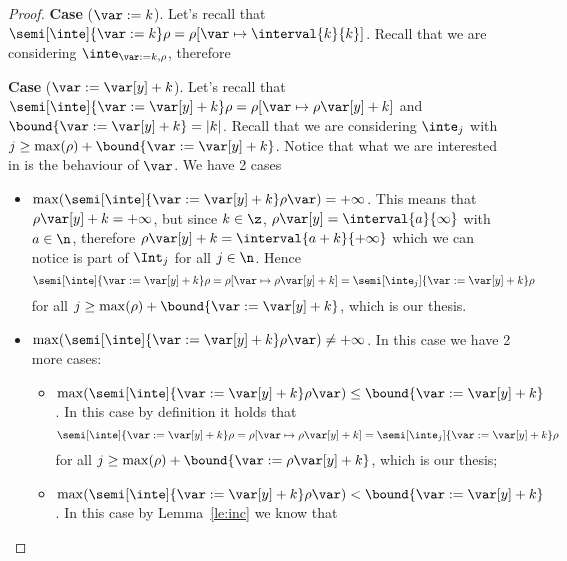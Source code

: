 \begin{proof}
  \medskip
  
  \noindent
  \textbf{Case} (\(\var := k\)).
  Let's recall that
  \({\semi[\inte]{\var := k}\rho = \rho[\var \mapsto \interval{k}{k}
    ]}\). Recall that we are considering \(\inte_{\var := k,\rho}\),
  therefore

  \medskip
  
  \noindent
  \textbf{Case} (\(\var := \var[y] + k\)).
  Let's recall that
  \({\semi[\inte]{\var := \var[y] + k}\rho = \rho[\var \mapsto
    \rho\var[y] + k]}\) and \(\bound{\var := \var[y] + k} =
  |k|\). Recall that we are considering \(\inte_j\) with
  \(j \geq \max(\rho) + \bound{\var := \var[y] + k}\). Notice that
  what we are interested in is the behaviour of \(\var\). We have 2
  cases
  \begin{itemize}
  \item
    \({\max(\semi[\inte]{\var := \var[y] + k}\rho\var)} =
    +\infty\). This means that \(\rho\var[y] + k = +\infty\), but
    since \(k \in \z\), \(\rho\var[y] = \interval{a}{\infty}\) with
    \(a \in \n\), therefore
    \({\rho\var[y] + k} = {\interval{a+k}{+\infty}}\) which we can
    notice is part of \(\Int_j\) for all \(j \in \n\). Hence
    \begin{equation*}
      \semi[\inte]{\var := \var[y] + k}\rho =
      \rho[\var \mapsto \rho\var[y] + k] =
      \semi[\inte_j]{\var := \var[y] + k}\rho
    \end{equation*}
    for all \(j \geq \max(\rho) + \bound{\var := \var[y] + k}\), which
    is our thesis.
  \item
    \({\max(\semi[\inte]{\var := \var[y] + k}\rho\var)} \neq
    +\infty\). In this case we have 2 more cases:
    \begin{itemize}
    \item
      \({\max(\semi[\inte]{\var := \var[y] + k}\rho\var)} \leq
      \bound{\var := \var[y] + k}\). In this case by definition it
      holds that
      \begin{equation*}
        {\semi[\inte]{\var := \var[y] + k}\rho} = \rho[\var \mapsto \rho\var[y] + k] = {\semi[\inte_j]{\var := \var[y] + k}\rho}
      \end{equation*}
      for all \(j \geq \max(\rho) + \bound{\var := \rho\var[y] + k}\),
      which is our thesis;
    \item
      \({\max(\semi[\inte]{\var := \var[y] + k}\rho\var)} <
      \bound{\var := \var[y] + k}\). In this case by
      Lemma~\ref{le:inc} we know that
      \begin{equation*}

\end{equation*}
\end{itemize}
\end{itemize}
\end{proof}
